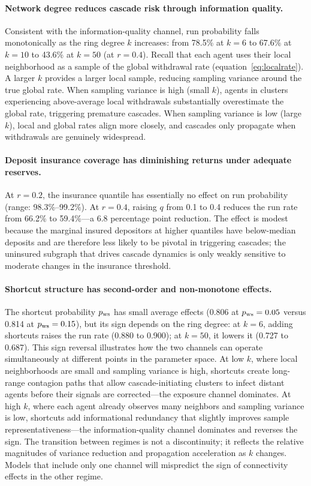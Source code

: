 \paragraph{Network degree reduces cascade risk through information
quality.}
Consistent with the information-quality channel, run probability
falls monotonically as the ring degree $k$ increases: from 78.5\%
at $k = 6$ to 67.6\% at $k = 10$ to 43.6\% at $k = 50$ (at
$r = 0.4$). Recall that each agent uses their local neighborhood as
a sample of the global withdrawal rate
(equation~\eqref{eq:localrate}). A larger $k$ provides a larger
local sample, reducing sampling variance around the true global
rate. When sampling variance is high (small $k$), agents in
clusters experiencing above-average local withdrawals substantially
overestimate the global rate, triggering premature cascades. When
sampling variance is low (large $k$), local and global rates align
more closely, and cascades only propagate when withdrawals are
genuinely widespread.

\paragraph{Deposit insurance coverage has diminishing returns under
adequate reserves.}
At $r = 0.2$, the insurance quantile has essentially no effect on
run probability (range: 98.3\%--99.2\%). At $r = 0.4$, raising $q$
from 0.1 to 0.4 reduces the run rate from 66.2\% to 59.4\%---a 6.8
percentage point reduction. The effect is modest because the
marginal insured depositors at higher quantiles have below-median
deposits and are therefore less likely to be pivotal in triggering
cascades; the uninsured subgraph that drives cascade dynamics is
only weakly sensitive to moderate changes in the insurance
threshold.

\paragraph{Shortcut structure has second-order and non-monotone
effects.}
The shortcut probability $p_{\rm ws}$ has small average effects
(0.806 at $p_{\rm ws} = 0.05$ versus 0.814 at $p_{\rm ws} = 0.15$),
but its sign depends on the ring degree: at $k = 6$, adding shortcuts
raises the run rate (0.880 to 0.900); at $k = 50$, it lowers it
(0.727 to 0.687). This sign reversal illustrates how the two
channels can operate simultaneously at different points in the
parameter space. At low $k$, where local neighborhoods are small
and sampling variance is high, shortcuts create long-range
contagion paths that allow cascade-initiating clusters to infect
distant agents before their signals are corrected---the exposure
channel dominates. At high $k$, where each agent already observes
many neighbors and sampling variance is low, shortcuts add
informational redundancy that slightly improves sample
representativeness---the information-quality channel dominates and
reverses the sign. The transition between regimes is not a
discontinuity; it reflects the relative magnitudes of variance
reduction and propagation acceleration as $k$ changes. Models
that include only one channel will mispredict the sign of
connectivity effects in the other regime.

